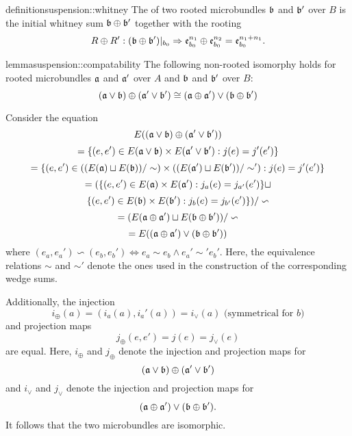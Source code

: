 \begin{mystatement}{definition}{suspension::whitney}
    The  of two rooted microbundles $\bb$ and $\bb'$ over $B$
    is the initial whitney sum $\whitney{\bb}{\bb'}$ together with the rooting
    \[ \germdef{\whitney{R}{R'}}{(\whitney{\bb}{\bb'})\restr{b_0}}{\whitney{\be[n_1]{b_0}}{\be[n_2]{b_0}} = \be[n_1 + n_1]{b_0}}. \]
\end{mystatement}

\begin{mystatement}{lemma}{suspension::compatability}   
    The following non-rooted isomorphy holds
    for rooted microbundles $\mathfrak{a}$ and $\mathfrak{a}'$ over $A$
    and $\bb$ and $\bb'$ over $B$: 
    \[
        \whitney{(\ba \vee \bb)}{(\ba' \vee \bb')}
        \cong (\whitney{\ba}{\ba'}) \vee (\whitney{\bb}{\bb'})
    \]
\end{mystatement}
\begin{myproof}
    Consider the equation
    \[ E(\whitney{(\ba \vee \bb)}{(\ba' \vee \bb')}) \]
    \[ = \set{(e, e') \in E(\ba \vee \bb) \cross E(\ba' \vee \bb')}{j(e) = j'(e')} \]
    \[ = \set{(e, e') \in ((E(\ba) \sqcup E(\bb)) / \sim) \cross ((E(\ba') \sqcup E(\bb')) / \sim')}{j(e) = j'(e')} \]
    \[ = (\{(e, e') \in E(\mathfrak{a}) \times E(\mathfrak{a}'):j_a(e) = j_{a'}(e')\} \sqcup \]
    \[ \set{(e, e') \in E(\bb) \cross E(\bb')}{j_b(e) = j_{b'}(e')}) / \backsim \]
    \[ = (E(\whitney{\ba}{\ba'}) \sqcup E(\whitney{\bb}{\bb'})) / \backsim \]
    \[ = E((\whitney{\ba}{\ba'}) \vee (\whitney{\bb}{\bb'})) \]
    where $(e_a, e_a') \backsim (e_b, e_b') \iff e_a \sim e_b \land e_a' \sim' e_b'$.
    Here, the equivalence relations $\sim$ and $\sim'$ denote the ones
    used in the construction of the corresponding wedge sums.

    Additionally, the injection
    \[ i_\oplus(a) = (i_a(a), i_a'(a)) = i_\vee(a) \text{ (symmetrical for $b$)}\]
    and projection maps
    \[ j_\oplus(e, e') = j(e) =  j_\vee(e) \]
    are equal.
    Here, $i_\oplus$ and $j_\oplus$ denote the injection and projection maps for
    \[ \whitney{(\ba \vee \bb)}{(\ba' \vee \bb')} \]
    and $i_\vee$ and $j_\vee$ denote the injection and projection maps for
    \[ (\whitney{\ba}{\ba'}) \vee (\whitney{\bb}{\bb'}). \]
    It follows that the two microbundles are isomorphic.
\end{myproof}